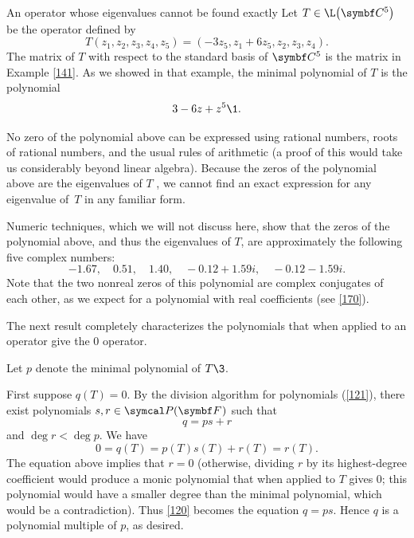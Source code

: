 \begin{example}[5noexact]{An operator whose eigenvalues cannot be found exactly}
Let $T \in \L\paren[\big]{ \C{5} }$ be the operator defined by
\[
T(z_1, z_2, z_3, z_4, z_5) = (-3z_5, z_1 + 6z_5, z_2, z_3, z_4).
\]
The matrix of $T$ with respect to the standard basis of $\C5$ is the  matrix in
Example \ref{141}. As we showed in that example, the minimal polynomial of $T$ is the polynomial
\[
3 - 6z + z^5\1.
\]

No zero of the polynomial above can be expressed using rational numbers, roots of rational numbers, and the usual rules of arithmetic (a proof of this would take us considerably beyond linear algebra). Because the zeros of the polynomial above are the eigenvalues of $T$ , we cannot find an exact expression for any eigenvalue of~$T$ in any familiar form.

Numeric techniques, which we will not discuss here, show that the zeros of the polynomial above, and thus the eigenvalues of $T$, are approximately the following five complex numbers:
\[
-1.67, \quad 0.51, \quad 1.40, \quad -0.12 + 1.59i, \quad -0.12 - 1.59i.
\]
Note that the two nonreal zeros of this polynomial are complex conjugates of each other, as we expect for a polynomial with real coefficients (see \ref{170}).
\end{example}

The next result completely characterizes the polynomials that when applied to an operator give the $0$ operator.


\proof
Let $p$ denote the minimal polynomial of $T\3$.

First suppose $q(T) = 0$.  By the division algorithm for polynomials (\ref{121}), there exist polynomials $s, r \in \P(\F{})$ such that
\begin{equation} \label{120}
q = p s + r
\end{equation}%
and $\deg r < \deg p$.  We have
\[
0 = q(T) = p(T)s(T) + r(T) = r(T).
\]
The equation above implies that $r = 0$ (otherwise, dividing $r$ by its highest-degree coefficient would produce a monic polynomial that when applied to $T$ gives $0$; this polynomial would have a smaller degree than the minimal polynomial, which would be a contradiction).  Thus \ref{120} becomes the equation $q = ps$. Hence $q$ is a polynomial multiple of $p$, as desired.

